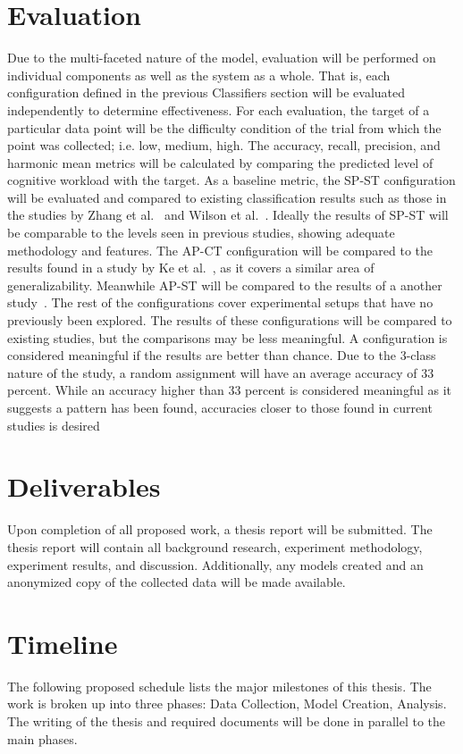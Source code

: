 \documentclass[11pt]{article}
\begin{document}
\section{Evaluation}
Due to the multi-faceted nature of the model, evaluation will be performed on individual components as well as the system as a whole. That is, each configuration defined in the previous Classifiers section will be evaluated independently to determine effectiveness. For each evaluation, the target of a particular data point will be the difficulty condition of the trial from which the point was collected; i.e. low, medium, high. The accuracy, recall, precision, and harmonic mean metrics will be calculated by comparing the predicted level of cognitive workload with the target. As a baseline metric, the SP-ST configuration will be evaluated and compared to existing classification results such as those in the studies by Zhang et al.~\cite{Zhang} and Wilson et al.~\cite{Wilson}. Ideally the results of SP-ST will be comparable to the levels seen in previous studies, showing adequate methodology and features. The AP-CT configuration will be compared to the results found in a study by Ke et al.~\cite{Ke}, as it covers a similar area of generalizability. Meanwhile AP-ST will be compared to the results of a another study~\cite{Wang_Z}. The rest of the configurations cover experimental setups that have no previously been explored. The results of these configurations will be compared to existing studies, but the comparisons may be less meaningful. A configuration is considered meaningful if the results are better than chance. Due to the 3-class nature of the study, a random assignment will have an average accuracy of 33 percent. While an accuracy higher than 33 percent is considered meaningful as it suggests a pattern has been found, accuracies closer to those found in current studies is desired

\section{Deliverables}
Upon completion of all proposed work, a thesis report will be submitted. The thesis report will contain all background research, experiment methodology, experiment results, and discussion. Additionally, any models created and an anonymized copy of the collected data will be made available. 

\section{Timeline}
The following proposed schedule lists the major milestones of this thesis. The work is broken up into three phases: Data Collection, Model Creation, Analysis. The writing of the thesis and required documents will be done in parallel to the main phases.
\end{document}

